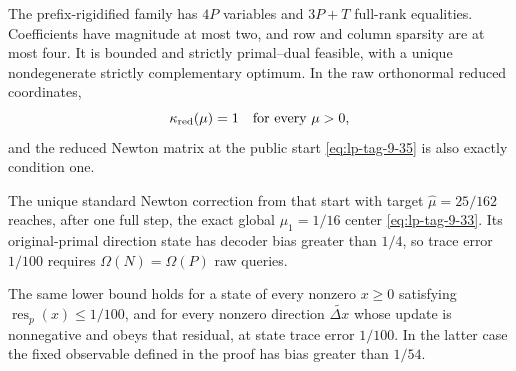 \begin{theorem}
\label{thm:lp-prefix-capstone}
The prefix-rigidified family has \(4P\) variables and \(3P+T\) full-rank
equalities.  Coefficients have magnitude at most two, and row and column
sparsity are at most four.  It is bounded and strictly primal--dual feasible,
with a unique nondegenerate strictly complementary optimum.  In the raw
orthonormal reduced coordinates,
\begin{equation}
 \kappa_{\rm red}(\mu)=1\quad\text{for every }\mu>0,
\end{equation}
and the reduced Newton matrix at the public start \eqref{eq:lp-tag-9-35} is also exactly
condition one.

The unique standard Newton correction from that start with target
\(\widehat\mu=25/162\) reaches, after one full step, the exact global
\(\mu_1=1/16\) center \eqref{eq:lp-tag-9-33}.  Its original-primal direction state has
decoder bias greater than \(1/4\), so trace error \(1/100\) requires
\(\Omega(N)=\Omega(P)\) raw queries.

The same lower bound holds for a state of every nonzero \(x\geq0\) satisfying
\(\operatorname{res}_p(x)\leq1/100\), and for every nonzero direction
\(\widetilde{\Delta x}\) whose update is nonnegative and obeys that residual,
at state trace error \(1/100\).  In the latter case the fixed observable
defined in the proof has bias greater than \(1/54\).
\end{theorem}

